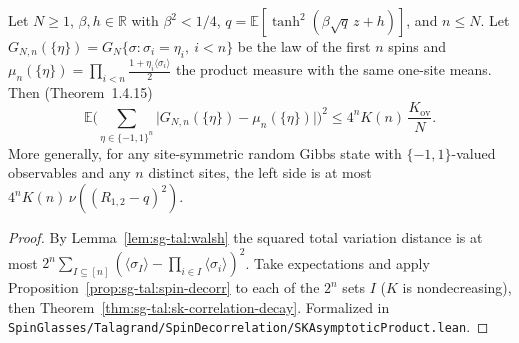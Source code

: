 \begin{theorem}\label{thm:sg-tal:asymp-product}
  \leanok
{}
Let $N\ge1$, $\beta,h\in\mathbb R$ with $\beta^2<1/4$, $q=\mathbb{E}[\tanh^2(\beta\sqrt q\,z+h)]$, and $n\le N$. Let $G_{N,n}(\{\eta\})=G_N\{\sigma:\sigma_i=\eta_i,\ i<n\}$ be the law of the first $n$ spins and $\mu_n(\{\eta\})=\prod_{i<n}\frac{1+\eta_i\langle\sigma_i\rangle}{2}$ the product measure with the same one-site means. Then (Theorem~1.4.15)
\[
\mathbb{E}\Big(\sum_{\eta\in\{-1,1\}^n}\big|G_{N,n}(\{\eta\})-\mu_n(\{\eta\})\big|\Big)^2\le4^nK(n)\,\frac{K_{\mathrm{ov}}}{N}.
\]
More generally, for any site-symmetric random Gibbs state with $\{-1,1\}$-valued observables and any $n$ distinct sites, the left side is at most $4^nK(n)\,\nu((R_{1,2}-q)^2)$.
\end{theorem}
\begin{proof}
\leanok
By Lemma~\ref{lem:sg-tal:walsh} the squared total variation distance is at most $2^n\sum_{I\subseteq[n]}(\langle\sigma_I\rangle-\prod_{i\in I}\langle\sigma_i\rangle)^2$. Take expectations and apply Proposition~\ref{prop:sg-tal:spin-decorr} to each of the $2^n$ sets $I$ ($K$ is nondecreasing), then Theorem~\ref{thm:sg-tal:sk-correlation-decay}.
Formalized in \texttt{SpinGlasses/Talagrand/SpinDecorrelation/SKAsymptoticProduct.lean}.
\end{proof}

